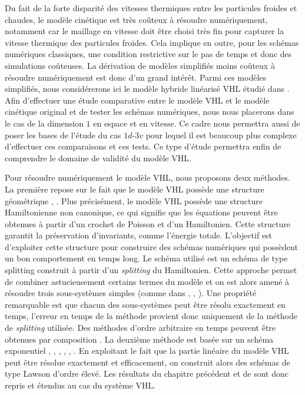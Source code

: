 Du fait de la forte disparité des vitesses thermiques entre les particules froides et chaudes, le modèle cinétique est très coûteux à résoudre numériquement, notamment car le maillage en vitesse doit être choisi très fin pour capturer la vitesse thermique des particules froides. Cela implique en outre, pour les schémas numériques classiques, une condition restrictive sur le pas de temps et donc des simulations coûteuses. La dérivation de modèles simplifiés moins coûteux à résoudre numériquement est donc d'un grand intérêt. Parmi ces modèles simplifiés, nous considérerons ici le modèle hybride linéarisé VHL étudié dans \cite{Holderied:2019}. Afin d'effectuer une étude comparative entre le modèle VHL et le modèle cinétique original et de tester les schémas numériques, nous nous placerons dans le cas de la dimension $1$ en espace et en vitesse. Ce cadre nous permettra aussi de poser les bases de l'étude du cas $1d$-$3v$ pour lequel il est beaucoup plus complexe d'effectuer ces comparaisons et ces tests. Ce type d'étude permettra enfin de comprendre le domaine de validité du modèle VHL. 

Pour résoudre numériquement le modèle VHL, nous proposons deux méthodes. La première repose sur le fait que le modèle VHL possède une structure géométrique \cite{Morrison:2017}\cite{Tronci:2010}, \cite{Tronci:2014}. Plus précisément, le modèle VHL possède une structure Hamiltonienne non canonique, ce qui signifie que les équations peuvent être obtenues à partir d'un crochet de Poisson et d'un Hamiltonien. Cette structure garantit la préservation d'invariants, comme l'énergie totale. L'objectif est d'exploiter cette structure pour construire des schémas numériques qui possèdent un bon comportement en temps long. Le schéma utilisé est un schéma de type splitting construit à partir d'un \emph{splitting} du Hamiltonien. Cette approche permet de combiner astucieusement certains termes du modèle et on est alors amené à résoudre trois sous-systèmes simples (comme dans \cite{Crouseilles:2015}, \cite{Casas:2017}, \cite{Li:2020}). Une propriété remarquable est que chacun des sous-systèmes peut être résolu exactement en temps, l'erreur en temps de la méthode provient donc uniquement de la méthode de \emph{splitting} utilisée. Des méthodes d'ordre arbitraire en temps peuvent être obtenues par composition \cite{Hairer:2006}. La deuxième méthode est basée sur un schéma exponentiel \cite{Hochbruck:2010}, \cite{Hochbruck:2005}, \cite{Lawson:1967a}, \cite{Isherwood:2018}, \cite{Lawson:1967}, \cite{Crouseilles:2019b}. En exploitant le fait que la partie linéaire du modèle VHL peut être résolue exactement et efficacement, on construit alors des schémas de type Lawson d'ordre élevé. Les résultats du chapitre précédent et de \cite{Crouseilles:2019b} sont donc repris et étendus au cas du système VHL. 

